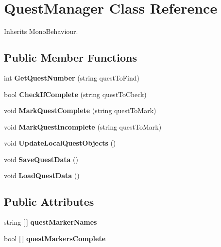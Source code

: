 \hypertarget{class_quest_manager}{}\section{Quest\+Manager Class Reference}
\label{class_quest_manager}


Inherits Mono\+Behaviour.

\subsection*{Public Member Functions}
\begin{DoxyCompactItemize}
\item 
\mbox{\label{class_quest_manager_a89442ae79c9b4527e0e8685f9a74d730}} 
int {\bfseries Get\+Quest\+Number} (string quest\+To\+Find)
\item 
\mbox{\label{class_quest_manager_ab61bed8bccbade175c239094cff9fa9a}} 
bool {\bfseries Check\+If\+Complete} (string quest\+To\+Check)
\item 
\mbox{\label{class_quest_manager_ae68d47c7910b403fd288746bc342614e}} 
void {\bfseries Mark\+Quest\+Complete} (string quest\+To\+Mark)
\item 
\mbox{\label{class_quest_manager_a0a574bc58ab2e4c65a91d552eb5c5025}} 
void {\bfseries Mark\+Quest\+Incomplete} (string quest\+To\+Mark)
\item 
\mbox{\label{class_quest_manager_ab935f58aceda98e42a2fe31413e72c24}} 
void {\bfseries Update\+Local\+Quest\+Objects} ()
\item 
\mbox{\label{class_quest_manager_a5e96b2a128759ba4e6f8bf90e5928fa1}} 
void {\bfseries Save\+Quest\+Data} ()
\item 
\mbox{\label{class_quest_manager_a69a3d4761e005f6721aa84ccba58cc6f}} 
void {\bfseries Load\+Quest\+Data} ()
\end{DoxyCompactItemize}
\subsection*{Public Attributes}
\begin{DoxyCompactItemize}
\item 
\mbox{\label{class_quest_manager_a4f268b69ea39c44b4576e50edb9c83b8}} 
string \mbox{[}$\,$\mbox{]} {\bfseries quest\+Marker\+Names}
\item 
\mbox{\label{class_quest_manager_a79d8697d5f1962eaa7cab65d3a9b1572}} 
bool \mbox{[}$\,$\mbox{]} {\bfseries quest\+Markers\+Complete}
\end{DoxyCompactItemize}
